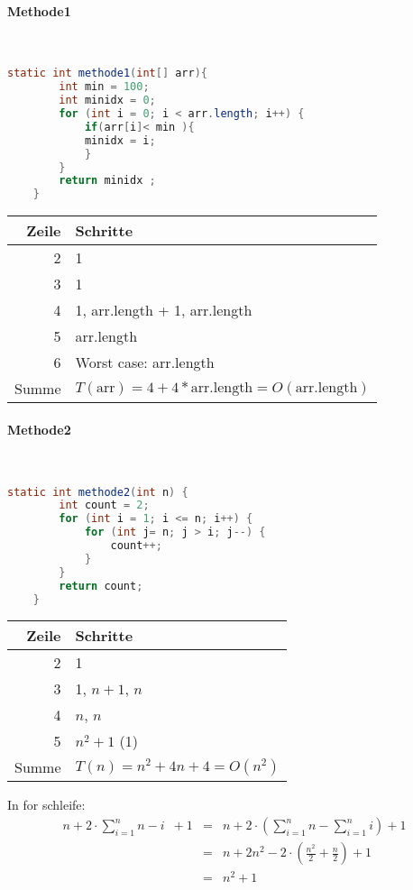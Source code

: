 \documentclass{article}
\begin{document}
    \uebungsblattTitel
    \paragraph{Methode1}
    \ \\
    \begin{lstlisting}[language=Java, autogobble]
    static int methode1(int[] arr){
        int min = 100;
        int minidx = 0;
        for (int i = 0; i < arr.length; i++) {
            if(arr[i]< min ){
            minidx = i;
            }
        }
        return minidx ;
    }
    \end{lstlisting}

    \begin{tabular}{r|l}
        Zeile & Schritte \\
        \hline
        2 & 1 \\
        3 & 1 \\
        4 & 1, arr.length + 1, arr.length \\
        5 & arr.length \\
        6 & Worst case: arr.length \\
        \hline
        Summe & $T(\text{arr})=4+4*\text{arr.length} = O(\text{arr.length})$
    \end{tabular}

    \paragraph{Methode2}
    \ \\
    \begin{lstlisting}[language=Java, autogobble]
    static int methode2(int n) {
        int count = 2;
        for (int i = 1; i <= n; i++) {
            for (int j= n; j > i; j--) {
                count++;
            }
        }
        return count;
    }
    \end{lstlisting}

    \begin{tabular}{r|l}
        Zeile & Schritte \\
        \hline
        2 & 1 \\
        3 & 1, $n + 1$, $n$ \\
        4 & $n$, $n$ \\
        5 & $n^2 + 1$ (1)\\
        \hline
        Summe & $T(n)=n^2+4n+4 = O(n^2)$
    \end{tabular}

    \vspace{1cm}
    In for schleife:
    \begin{eqnarray}
        n + 2 \cdot \sum_{i=1}^nn-i \enspace + 1
        &=& n + 2 \cdot (\sum_{i=1}^nn - \sum_{i=1}^ni) + 1 \nonumber\\
        &=& n + 2n^2 - 2 \cdot (\frac{n^2}{2} + \frac{n}{2}) +1 \nonumber\\
        &=& n^2 +1
    \end{eqnarray}
\end{document}
